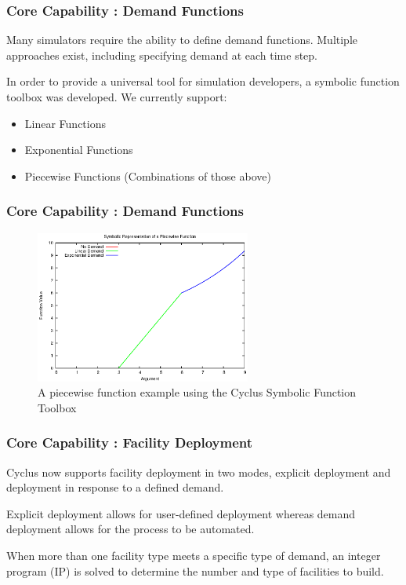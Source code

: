 
\begin{frame}
  \frametitle{Core Capability : Demand Functions}
  Many simulators require the ability to define demand functions. 
  Multiple approaches exist, including specifying demand at each time
  step. 

  \vspace{0.2cm}

  In order to provide a universal tool for simulation developers, a 
  symbolic function toolbox was developed. We currently support:
  \begin{itemize}
    \item Linear Functions
    \item Exponential Functions
    \item Piecewise Functions (Combinations of those above)
  \end{itemize}
\end{frame}

\begin{frame}[ctb!]
  \frametitle{Core Capability : Demand Functions}
  \begin{figure}[htbp!]
    \begin{center}
      \includegraphics[height=5cm]{piecewise.eps}
    \caption{A piecewise function example using the Cyclus Symbolic 
      Function Toolbox}
    \label{fig:piecewisefunction}
    \end{center}
  \end{figure}
\end{frame}

\begin{frame}
  \frametitle{Core Capability : Facility Deployment}
  Cyclus now supports facility deployment in two modes, explicit 
  deployment and deployment in response to a defined demand.

  \vspace{1cm}

  Explicit deployment allows for user-defined deployment whereas 
  demand deployment allows for the process to be automated.

  \vspace{1cm}

  When more than one facility type meets a specific type of demand,
  an integer program (IP) is solved to determine the number and type of
  facilities to build.
\end{frame}

